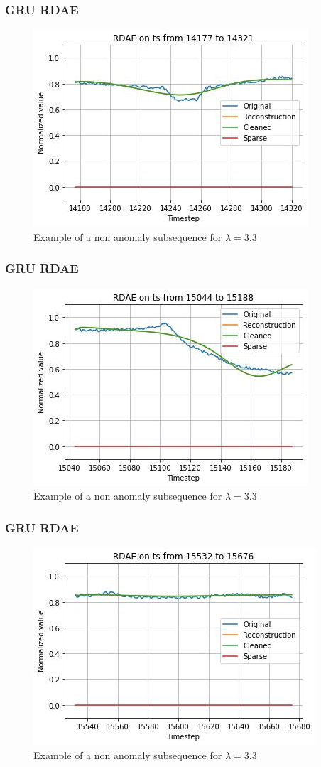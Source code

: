 \documentclass{beamer}
\theoremstyle{plain}
\theoremstyle{definition}
\theoremstyle{remark}
\begin{document}
\begin{frame}
	\frametitle{GRU RDAE}
	\begin{figure}
		\centering
		\includegraphics[width=0.7\linewidth]{Images/GRUlam3.3ts_non_anomalyzoom14177.jpg}
		\caption[]{Example of a non anomaly subsequence for $\lambda=3.3$}
	\end{figure}
\end{frame}

\begin{frame}
	\frametitle{GRU RDAE}
	\begin{figure}
		\centering
		\includegraphics[width=0.7\linewidth]{Images/GRUlam3.3ts_non_anomalyzoom15044.jpg}
		\caption[]{Example of a non anomaly subsequence for $\lambda=3.3$}
	\end{figure}
\end{frame}

\begin{frame}
	\frametitle{GRU RDAE}
	\begin{figure}
		\centering
		\includegraphics[width=0.7\linewidth]{Images/GRUlam3.3ts_non_anomalyzoom15532.jpg}
		\caption[]{Example of a non anomaly subsequence for $\lambda=3.3$}
	\end{figure}
\end{frame}
\end{document}
